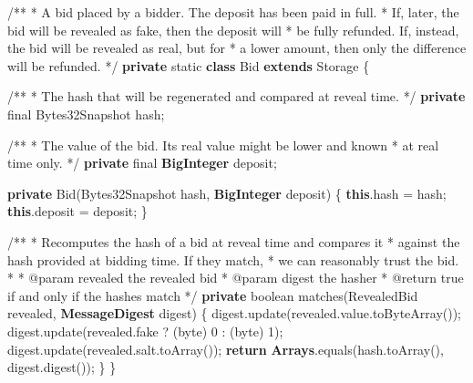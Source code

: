 \documentclass[a4paper,]{book}
\newenvironment{Shaded}{\begin{snugshade}}{\end{snugshade}}
\newcommand{\AnnotationTok}[1]{\textcolor[rgb]{0.79,0.38,0.79}{#1}}
\newcommand{\BuiltInTok}[1]{\textcolor[rgb]{0.39,0.29,0.61}{\textbf{#1}}}
\newcommand{\CommentTok}[1]{\textcolor[rgb]{0.54,0.53,0.53}{#1}}
\newcommand{\DataTypeTok}[1]{\textcolor[rgb]{0.00,0.34,0.68}{#1}}
\newcommand{\DecValTok}[1]{\textcolor[rgb]{0.69,0.50,0.00}{#1}}
\newcommand{\FunctionTok}[1]{\textcolor[rgb]{0.39,0.29,0.61}{#1}}
\newcommand{\KeywordTok}[1]{\textcolor[rgb]{0.12,0.11,0.11}{\textbf{#1}}}
\newcommand{\NormalTok}[1]{\textcolor[rgb]{0.12,0.11,0.11}{#1}}
\renewenvironment{Shaded}{\begin{snugshade}\small}{\end{snugshade}}
\begin{document}
{\begin{Shaded}
\begin{Highlighting}[]
  \CommentTok{/**}
   \CommentTok{*}\NormalTok{ A bid placed by a bidder}\CommentTok{. }\NormalTok{The deposit has been paid in full}\CommentTok{.}
   \CommentTok{*}\NormalTok{ If}\CommentTok{,}\NormalTok{ later}\CommentTok{,}\NormalTok{ the bid will be revealed as fake}\CommentTok{,}\NormalTok{ then the deposit will}
   \CommentTok{*}\NormalTok{ be fully refunded}\CommentTok{.}\NormalTok{ If}\CommentTok{,}\NormalTok{ instead}\CommentTok{,}\NormalTok{ the bid will be revealed as real}\CommentTok{,}\NormalTok{ but for}
   \CommentTok{*}\NormalTok{ a lower amount}\CommentTok{,}\NormalTok{ then only the difference will be refunded}\CommentTok{.}
   \CommentTok{*/}
  \KeywordTok{private} \DataTypeTok{static} \KeywordTok{class}\NormalTok{ Bid }\KeywordTok{extends}\NormalTok{ Storage \{}

    \CommentTok{/**}
     \CommentTok{*}\NormalTok{ The hash that will be regenerated and compared at reveal time}\CommentTok{.}
     \CommentTok{*/}
    \KeywordTok{private} \DataTypeTok{final}\NormalTok{ Bytes32Snapshot hash;}

    \CommentTok{/**}
      \CommentTok{*}\NormalTok{ The value of the bid}\CommentTok{. }\NormalTok{Its real value might be lower and known}
      \CommentTok{*}\NormalTok{ at real time only}\CommentTok{.}
      \CommentTok{*/}
    \KeywordTok{private} \DataTypeTok{final} \BuiltInTok{BigInteger}\NormalTok{ deposit;}

    \KeywordTok{private} \FunctionTok{Bid}\NormalTok{(Bytes32Snapshot hash, }\BuiltInTok{BigInteger}\NormalTok{ deposit) \{}
      \KeywordTok{this}\NormalTok{.}\FunctionTok{hash}\NormalTok{ = hash;}
      \KeywordTok{this}\NormalTok{.}\FunctionTok{deposit}\NormalTok{ = deposit;}
\NormalTok{    \}}

    \CommentTok{/**}
     \CommentTok{*}\NormalTok{ Recomputes the hash of a bid at reveal time and compares it}
     \CommentTok{*}\NormalTok{ against the hash provided at bidding time}\CommentTok{. }\NormalTok{If they match}\CommentTok{,}
     \CommentTok{*}\NormalTok{ we can reasonably trust the bid}\CommentTok{.}
     \CommentTok{*} 
     \CommentTok{*} \AnnotationTok{@param revealed }\NormalTok{the revealed bid}
     \CommentTok{*} \AnnotationTok{@param digest }\NormalTok{the hasher}
     \CommentTok{*} \AnnotationTok{@return }\NormalTok{true if and only if the hashes match}
     \CommentTok{*/}
    \KeywordTok{private} \DataTypeTok{boolean} \FunctionTok{matches}\NormalTok{(RevealedBid revealed, }\BuiltInTok{MessageDigest}\NormalTok{ digest) \{}
\NormalTok{      digest.}\FunctionTok{update}\NormalTok{(revealed.}\FunctionTok{value}\NormalTok{.}\FunctionTok{toByteArray}\NormalTok{());}
\NormalTok{      digest.}\FunctionTok{update}\NormalTok{(revealed.}\FunctionTok{fake}\NormalTok{ ? (}\DataTypeTok{byte}\NormalTok{) }\DecValTok{0}\NormalTok{ : (}\DataTypeTok{byte}\NormalTok{) }\DecValTok{1}\NormalTok{);}
\NormalTok{      digest.}\FunctionTok{update}\NormalTok{(revealed.}\FunctionTok{salt}\NormalTok{.}\FunctionTok{toArray}\NormalTok{());}
      \KeywordTok{return} \BuiltInTok{Arrays}\NormalTok{.}\FunctionTok{equals}\NormalTok{(hash.}\FunctionTok{toArray}\NormalTok{(), digest.}\FunctionTok{digest}\NormalTok{());}
\NormalTok{    \}}
\NormalTok{  \}}


\end{Highlighting}
\end{Shaded}}
\end{document}
